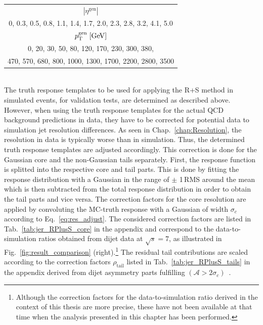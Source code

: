 \begin{description}
\begin{table}[!t]
{\begin{tabular}{c}
\toprule
 $|\eta^\mathrm{gen}|$ \\
 0, 0.3, 0.5, 0.8, 1.1, 1.4, 1.7, 2.0, 2.3, 2.8, 3.2, 4.1, 5.0 \\
\midrule
$p_{\text{T}}^\mathrm{gen} \; [\mathrm{GeV}]$ \\
0, 20, 30, 50, 80, 120, 170, 230, 300, 380, \\
470, 570, 680, 800, 1000, 1300, 1700, 2200, 2800, 3500 \\
\bottomrule
\end{tabular}}
\end{table} 
\\
The truth response templates to be used for applying the R+S method in simulated events, \eg for validation tests, are determined as described above. However, when using the truth response templates for the actual QCD background predictions in data, they have to be corrected for potential data to simulation jet resolution differences. As seen in Chap.~\ref{chap:Resolution}, the resolution in data is typically worse than in simulation. Thus, the determined truth response templates are adjusted accordingly. This correction is done for the Gaussian core and the non-Gaussian tails separately. First, the response function is splitted into the respective core and tail parts. This is done by fitting the response distribution with a Gaussian in the range of $\pm$ 1\,RMS around the mean which is then subtracted from the total response distribution in order to obtain the tail parts and vice versa. The correction factors for the core resolution are applied by convoluting the MC-truth response with a Gaussian of width $\sigma_{c}$ according to Eq.~\ref{eq:res_adjust}. The considered correction factors are listed in Tab.~\ref{tab:jer_RPlusS_core} in the appendix and correspond to the data-to-simulation ratios obtained from dijet data at $\sqrt{s} = 7$\tev, as illustrated in Fig.~\ref{fig:result_comparison} (right).\footnote{Although the correction factors for the data-to-simulation ratio derived in the context of this thesis are more precise, these have not been available at that time when the analysis presented in this chapter has been performed.} The residual tail contributions are scaled according to the correction factors $\rho_\mathrm{tail}$ listed in Tab.~\ref{tab:jer_RPlusS_tails} in the appendix derived from dijet asymmetry parts fulfilling $(\mathcal{A} > 2 \sigma_c)$~\cite{thesis:Schroeder}.   


\end{description}

